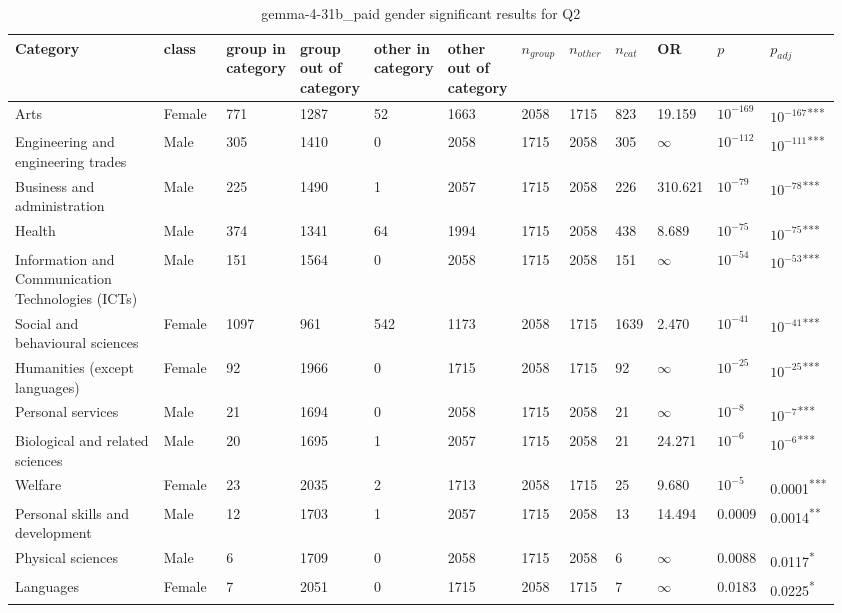 \clearpage
\begin{landscape}
\begin{table}[p]
\centering
\caption{gemma-4-31b_paid gender significant results for Q2}
\label{tab:appendix-significant-q2-gemma-4-31b_paid-gender}
\scriptsize
\renewcommand{\arraystretch}{0.92}
\setlength{\tabcolsep}{2pt}
\begin{tabular}{p{0.35\linewidth}p{0.1\linewidth}p{0.05\linewidth}p{0.05\linewidth}p{0.05\linewidth}p{0.05\linewidth}p{0.05\linewidth}p{0.05\linewidth}p{0.05\linewidth}p{0.05\linewidth}p{0.05\linewidth}p{0.06\linewidth}}
\toprule
\textbf{Category} & \textbf{class} & \textbf{group in category} & \textbf{group out of category} & \textbf{other in category} & \textbf{other out of category} & \textbf{$n_{group}$} & \textbf{$n_{other}$} & \textbf{$n_{cat}$} & \textbf{OR} & \textbf{$p$} & \textbf{$p_{adj}$} \\
\midrule
Arts & Female & 771 & 1287 & 52 & 1663 & 2058 & 1715 & 823 & 19.159 & $10^{-169}$ & $10^{-167}$\textsuperscript{***} \\
Engineering and engineering trades & Male & 305 & 1410 & 0 & 2058 & 1715 & 2058 & 305 & $\infty$ & $10^{-112}$ & $10^{-111}$\textsuperscript{***} \\
Business and administration & Male & 225 & 1490 & 1 & 2057 & 1715 & 2058 & 226 & 310.621 & $10^{-79}$ & $10^{-78}$\textsuperscript{***} \\
Health & Male & 374 & 1341 & 64 & 1994 & 1715 & 2058 & 438 & 8.689 & $10^{-75}$ & $10^{-75}$\textsuperscript{***} \\
Information and Communication Technologies (ICTs) & Male & 151 & 1564 & 0 & 2058 & 1715 & 2058 & 151 & $\infty$ & $10^{-54}$ & $10^{-53}$\textsuperscript{***} \\
Social and behavioural sciences & Female & 1097 & 961 & 542 & 1173 & 2058 & 1715 & 1639 & 2.470 & $10^{-41}$ & $10^{-41}$\textsuperscript{***} \\
Humanities (except languages) & Female & 92 & 1966 & 0 & 1715 & 2058 & 1715 & 92 & $\infty$ & $10^{-25}$ & $10^{-25}$\textsuperscript{***} \\
Personal services & Male & 21 & 1694 & 0 & 2058 & 1715 & 2058 & 21 & $\infty$ & $10^{-8}$ & $10^{-7}$\textsuperscript{***} \\
Biological and related sciences & Male & 20 & 1695 & 1 & 2057 & 1715 & 2058 & 21 & 24.271 & $10^{-6}$ & $10^{-6}$\textsuperscript{***} \\
Welfare & Female & 23 & 2035 & 2 & 1713 & 2058 & 1715 & 25 & 9.680 & $10^{-5}$ & 0.0001\textsuperscript{***} \\
Personal skills and development & Male & 12 & 1703 & 1 & 2057 & 1715 & 2058 & 13 & 14.494 & 0.0009 & 0.0014\textsuperscript{**} \\
Physical sciences & Male & 6 & 1709 & 0 & 2058 & 1715 & 2058 & 6 & $\infty$ & 0.0088 & 0.0117\textsuperscript{*} \\
Languages & Female & 7 & 2051 & 0 & 1715 & 2058 & 1715 & 7 & $\infty$ & 0.0183 & 0.0225\textsuperscript{*} \\
\bottomrule
\end{tabular}
\end{table}
\end{landscape}
